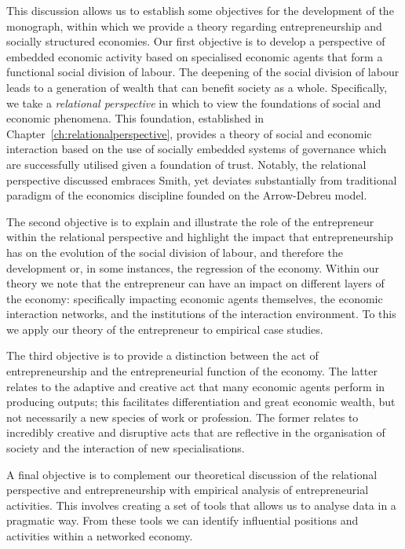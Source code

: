 This discussion allows us to establish some objectives for the development of the monograph, within which we provide a theory regarding entrepreneurship and socially structured economies. Our first objective is to develop a perspective of embedded economic activity based on specialised economic agents that form a functional social division of labour. The deepening of the social division of labour leads to a generation of wealth that can benefit society as a whole. Specifically, we take a \emph{relational perspective} in which to view the foundations of social and economic phenomena. This foundation, established in Chapter~\ref{ch:relationalperspective}, provides a theory of social and economic interaction based on the use of socially embedded systems of governance which are successfully utilised given a foundation of trust. Notably, the relational perspective discussed embraces Smith, yet deviates substantially from traditional paradigm of the economics discipline founded on the Arrow-Debreu model.

The second objective is to explain and illustrate the role of the entrepreneur within the relational perspective and highlight the impact that entrepreneurship has on the evolution of the social division of labour, and therefore the development or, in some instances, the regression of the economy. Within our theory we note that the entrepreneur can have an impact on different layers of the economy: specifically impacting economic agents themselves, the economic interaction networks, and the institutions of the interaction environment. To this we apply our theory of the entrepreneur to empirical case studies.

The third objective is to provide a distinction between the act of entrepreneurship and the entrepreneurial function of the economy. The latter relates to the adaptive and creative act that many economic agents perform in producing outputs; this facilitates differentiation and great economic wealth, but not necessarily a new species of work or profession. The former relates to incredibly creative and disruptive acts that are reflective in the organisation of society and the interaction of new specialisations.

A final objective is to complement our theoretical discussion of the relational perspective and entrepreneurship with empirical analysis of entrepreneurial activities. This involves creating a set of tools that allows us to analyse data in a pragmatic way. From these tools we can identify influential positions and activities within a networked economy.


